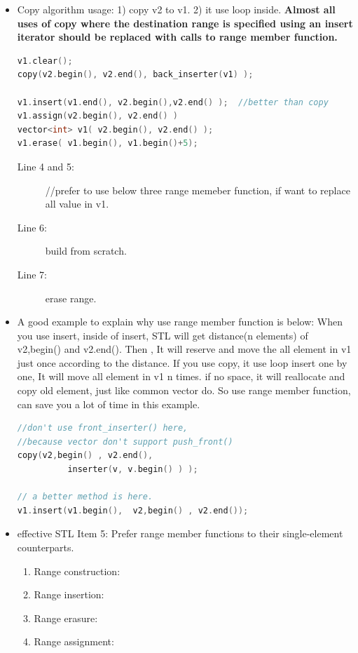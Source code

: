 \documentclass[a4paper,11pt,twoside]{book}
\begin{document}
\begin{itemize}

\item Copy algorithm usage: 1) copy v2 to v1.  2) it use loop inside.  \textbf{Almost all uses of copy where the destination range is specified using an insert iterator should be replaced with calls to range member function.}

\begin{lstlisting}[frame=single, language=c++]
v1.clear();
copy(v2.begin(), v2.end(), back_inserter(v1) );

v1.insert(v1.end(), v2.begin(),v2.end() );  //better than copy
v1.assign(v2.begin(), v2.end() )
vector<int> v1( v2.begin(), v2.end() );
v1.erase( v1.begin(), v1.begin()+5);
\end{lstlisting}
\begin{description}
	\item[Line 4 and 5:] //prefer to use below three range memeber function, if want to replace all value in v1.
	
	\item[Line 6:] build from scratch.
	
	\item[Line 7:]erase range.
\end{description}

\item A good example to explain why use range member function is below: When you use insert, inside of insert,  STL will get distance(n elements) of v2,begin() and v2.end(). Then , It will reserve and move the all element in v1 just once according to the distance.  If you use copy, it use loop insert one by one, It will move all element in v1 n times. if no space, it will reallocate and copy old element, just like common vector do. So use range member function, can save you a lot of time in this example.

\begin{lstlisting}[frame=single, language=c++]
//don't use front_inserter() here,
//because vector don't support push_front()
copy(v2,begin() , v2.end(),
          inserter(v, v.begin() ) );

// a better method is here.
v1.insert(v1.begin(),  v2,begin() , v2.end());
\end{lstlisting}

\item effective STL Item 5: Prefer range member functions to their single-element counterparts.
\begin{enumerate}
\item Range construction:
\item Range insertion:
\item Range erasure:
\item Range assignment:
\end{enumerate}


\end{itemize}
\end{document}
